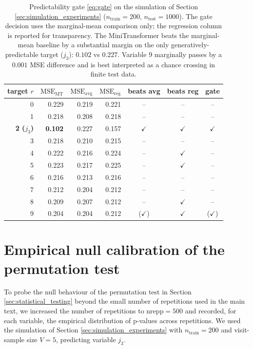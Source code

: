 \documentclass[AMA,Times1COL]{WileyNJDv5} %
\begin{document}
\begin{table}[ht]
\centering
\small
\begin{tabular}{r r r r c c c}
\toprule
target $r$ & $\mathrm{MSE}_{\mathrm{MT}}$ & $\mathrm{MSE}_{\mathrm{avg}}$ & $\mathrm{MSE}_{\mathrm{reg}}$ & beats avg & beats reg & gate \\
\midrule
0 & 0.229 & 0.219 & 0.221 & -- & -- & -- \\
1 & 0.218 & 0.208 & 0.218 & -- & -- & -- \\
\textbf{2 ($j_3$)} & \textbf{0.102} & 0.227 & 0.157 & $\checkmark$ & $\checkmark$ & \textbf{$\checkmark$} \\
3 & 0.218 & 0.210 & 0.215 & -- & -- & -- \\
4 & 0.222 & 0.216 & 0.224 & -- & $\checkmark$ & -- \\
5 & 0.223 & 0.217 & 0.225 & -- & $\checkmark$ & -- \\
6 & 0.216 & 0.213 & 0.216 & -- & -- & -- \\
7 & 0.212 & 0.204 & 0.212 & -- & -- & -- \\
8 & 0.209 & 0.207 & 0.212 & -- & $\checkmark$ & -- \\
9 & 0.204 & 0.204 & 0.212 & ($\checkmark$) & $\checkmark$ & ($\checkmark$) \\
\bottomrule
\end{tabular}
\caption{Predictability gate \eqref{eq:gate} on the simulation of Section \ref{sec:simulation_experiments} ($n_{\mathrm{train}}=200$, $n_{\mathrm{test}}=1000$). The gate decision uses the marginal-mean comparison only; the regression column is reported for transparency. The MiniTransformer beats the marginal-mean baseline by a substantial margin on the only generatively-predictable target ($j_3$): $0.102$ vs $0.227$. Variable $9$ marginally passes by a $0.001$ MSE difference and is best interpreted as a chance crossing in finite test data.}
\label{tab:supp_gate}
\end{table}


\section{Empirical null calibration of the permutation test}\label{sec:supp_calibration}

To probe the null behaviour of the permutation test in Section \ref{sec:statistical_testing} beyond the small number of repetitions used in the main text, we increased the number of repetitions to $\mathrm{nrepp}=500$ and recorded, for each variable, the empirical distribution of p-values across repetitions. We used the simulation of Section \ref{sec:simulation_experiments} with $n_{\mathrm{train}}=200$ and visit-sample size $V=5$, predicting variable $j_3$.
\end{document}
